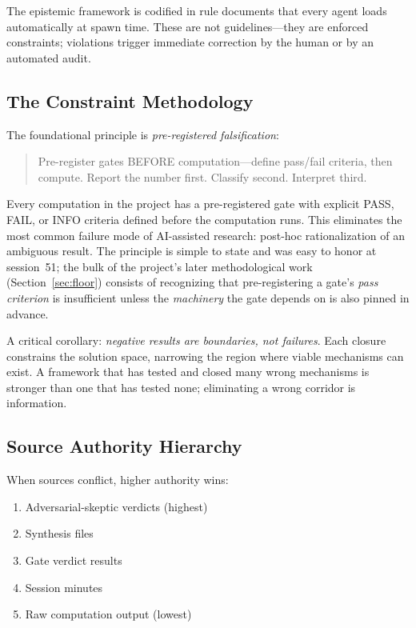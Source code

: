 \documentclass[12pt,a4paper]{article}
\begin{document}
The epistemic framework is codified in rule documents that every agent loads automatically at spawn time. These are not guidelines---they are enforced constraints; violations trigger immediate correction by the human or by an automated audit.

\subsection{The Constraint Methodology}

The foundational principle is \emph{pre-registered falsification}:

\begin{quote}
Pre-register gates BEFORE computation---define pass/fail criteria, then compute. Report the number first. Classify second. Interpret third.
\end{quote}

Every computation in the project has a pre-registered gate with explicit PASS, FAIL, or INFO criteria defined before the computation runs. This eliminates the most common failure mode of AI-assisted research: post-hoc rationalization of an ambiguous result. The principle is simple to state and was easy to honor at session~51; the bulk of the project's later methodological work (Section~\ref{sec:floor}) consists of recognizing that pre-registering a gate's \emph{pass criterion} is insufficient unless the \emph{machinery} the gate depends on is also pinned in advance.

A critical corollary: \emph{negative results are boundaries, not failures}. Each closure constrains the solution space, narrowing the region where viable mechanisms can exist. A framework that has tested and closed many wrong mechanisms is stronger than one that has tested none; eliminating a wrong corridor is information.

\subsection{Source Authority Hierarchy}

When sources conflict, higher authority wins:

\begin{enumerate}
    \item Adversarial-skeptic verdicts (highest)
    \item Synthesis files
    \item Gate verdict results
    \item Session minutes
    \item Raw computation output (lowest)
\end{enumerate}
\end{document}
